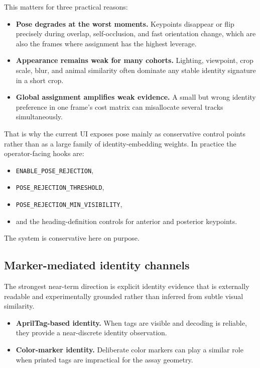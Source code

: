 \documentclass[11pt]{article}
\newcommand{\runtimekey}[1]{\texttt{#1}}
\begin{document}
This matters for three practical reasons:

\begin{itemize}
  \item \textbf{Pose degrades at the worst moments.} Keypoints disappear or flip precisely during overlap, self-occlusion, and fast orientation change, which are also the frames where assignment has the highest leverage.
  \item \textbf{Appearance remains weak for many cohorts.} Lighting, viewpoint, crop scale, blur, and animal similarity often dominate any stable identity signature in a short crop.
  \item \textbf{Global assignment amplifies weak evidence.} A small but wrong identity preference in one frame's cost matrix can misallocate several tracks simultaneously.
\end{itemize}

That is why the current UI exposes pose mainly as conservative control points rather than as a large family of identity-embedding weights. In practice the operator-facing hooks are:
\begin{itemize}
  \item \runtimekey{ENABLE\_POSE\_REJECTION},
  \item \runtimekey{POSE\_REJECTION\_THRESHOLD},
  \item \runtimekey{POSE\_REJECTION\_MIN\_VISIBILITY},
  \item and the heading-definition controls for anterior and posterior keypoints.
\end{itemize}

The system is conservative here on purpose.

\subsection{Marker-mediated identity channels}

The strongest near-term direction is explicit identity evidence that is externally readable and experimentally grounded rather than inferred from subtle visual similarity.

\begin{itemize}
  \item \textbf{AprilTag-based identity.} When tags are visible and decoding is reliable, they provide a near-discrete identity observation.
  \item \textbf{Color-marker identity.} Deliberate color markers can play a similar role when printed tags are impractical for the assay geometry.
\end{itemize}
\end{document}
